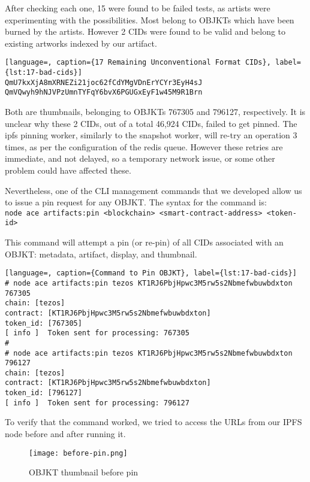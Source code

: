After checking each one, 15 were found to be failed tests, as artists were experimenting with the possibilities. Most belong to OBJKTs which have been burned by the artists. However 2 CIDs were found to be valid and belong to existing artworks indexed by our artifact.

\begin{lstlisting}[language=, caption={17 Remaining Unconventional Format CIDs}, label={lst:17-bad-cids}] 
QmU7kxXjA8mXRNEZi21joc62fCdYMgVDnErYCYr3EyH4sJ
QmVQwyh9hNJVPzUmnTYFqY6bvX6PGUGxEyF1w45M9R1Brn 
\end{lstlisting}

Both are thumbnails, belonging to OBJKTs 767305 and 796127, respectively. It is unclear why these 2 CIDs, out of a total 46,924 CIDs, failed to get pinned. The ipfs pinning worker, similarly to the snapshot worker, will re-try an operation 3 times, as per the configuration of the redis queue. However these retries are immediate, and not delayed, so a temporary network issue, or some other problem could have affected these.

Nevertheless, one of the CLI management commands that we developed allow us to issue a pin request for any OBJKT. The syntax for the command is:\\
{
\footnotesize{\texttt{node ace artifacts:pin <blockchain> <smart-contract-address> <token-id>}}\\
}


This command will attempt a pin (or re-pin) of all CIDs associated with an OBJKT: metadata, artifact, display, and thumbnail.
\begin{lstlisting}[language=, caption={Command to Pin OBJKT}, label={lst:17-bad-cids}] 
# node ace artifacts:pin tezos KT1RJ6PbjHpwc3M5rw5s2Nbmefwbuwbdxton 767305
chain: [tezos]
contract: [KT1RJ6PbjHpwc3M5rw5s2Nbmefwbuwbdxton]
token_id: [767305]
[ info ]  Token sent for processing: 767305
#
# node ace artifacts:pin tezos KT1RJ6PbjHpwc3M5rw5s2Nbmefwbuwbdxton 796127
chain: [tezos]
contract: [KT1RJ6PbjHpwc3M5rw5s2Nbmefwbuwbdxton]
token_id: [796127]
[ info ]  Token sent for processing: 796127
\end{lstlisting}

To verify that the command worked, we tried to access the URLs from our IPFS node before and after running it.


\begin{figure}[H]
    \centering
    \texttt{[image: before-pin.png]}
    \caption[OBJKT thumbnail before pin]{OBJKT thumbnail before pin}
    \label{fig:before-pin}
\end{figure}


